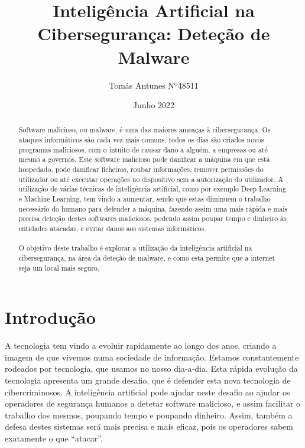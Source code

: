 \documentclass[11pt]{article}
\title{Inteligência Artificial na Cibersegurança: Deteção de Malware}
\author{Tomás Antunes Nº48511}
\date{Junho 2022}
\begin{document}
\maketitle

\begin{abstract}

Software malicioso, ou malware, é uma das maiores ameaças à cibersegurança. Os ataques informáticos são cada vez mais comuns, todos os dias são criados novos programas maliciosos, com o intuito de causar dano a alguém, a empresas ou até mesmo a governos. Este software malicioso pode danificar a máquina em que está hospedado, pode danificar ficheiros, roubar informações, remover permissões do utilizador ou até executar operações no dispositivo sem a autorização do utilizador. A utilização de várias técnicas de inteligência artificial, como por exemplo Deep Learning e Machine Learning, tem vindo a aumentar, sendo que estas diminuem o trabalho necessário do humano para defender a máquina, fazendo assim uma mais rápida e mais precisa deteção destes softwares maliciosos, podendo assim poupar tempo e dinheiro às entidades atacadas, e evitar danos aos sistemas informáticos. 
\paragraph{}
O objetivo deste trabalho é explorar a utilização da inteligência artificial na cibersegurança, na área da deteção de malware, e como esta permite que a internet seja um local mais seguro.

\end{abstract}

\section*{Introdução}

A tecnologia tem vindo a evoluir rapidamente ao longo dos anos, criando a imagem de que vivemos numa sociedade de informação. Estamos constantemente rodeados por tecnologia, que usamos no nosso dia-a-dia. Esta rápida evolução da tecnologia apresenta um grande desafio, que é defender esta nova tecnologia de cibercriminosos. A inteligência artificial pode ajudar neste desafio ao ajudar os operadores de segurança humanos a detetar software malicioso, e assim facilitar o trabalho dos mesmos, poupando tempo e poupando dinheiro. Assim, também a defesa destes sistemas será mais precisa e mais eficaz, pois os operadores sabem exatamente o que “atacar”.\cite{1}
\end{document}
